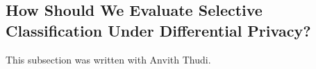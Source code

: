 


\subsection{How Should We Evaluate Selective Classification Under Differential Privacy?}
\label{sec:new_metric}

\begin{contriback}
This subsection was written with Anvith Thudi.
\end{contriback}





